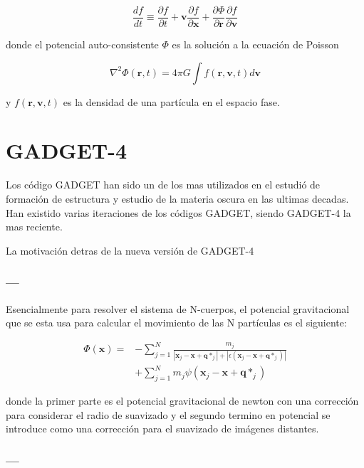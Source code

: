 \begin{equation}
\frac{d f}{d t} \equiv \frac{\partial f}{\partial t} + \mathbf{v}\frac{\partial f}{\partial \mathbf{x}} + \frac{\partial \Phi}{\partial \mathbf{r}} \frac{\partial f}{\partial \mathbf{v}}
\label{CBE}
\end{equation}

donde el potencial auto-consistente $\Phi$ es la solución a la ecuación de Poisson

\begin{equation}
\nabla^2\Phi(\mathbf{r},t) = 4\pi G \int f(\mathbf{r},\mathbf{v},t)d\mathbf{v}
\label{PoissonSol}
\end{equation}

y $f(\mathbf{r},\mathbf{v},t)$ es la densidad de una partícula en el espacio fase.




\section{GADGET-4}
Los código GADGET han sido un de los mas utilizados en el estudió de formación de estructura y estudio de la materia oscura en las ultimas decadas. Han existido varias iteraciones de los códigos GADGET, siendo GADGET-4 la mas reciente.

La motivación detras de la nueva versión de GADGET-4
\cite{2021MNRAS.506.2871S}






\subsubsection{---}
Esencialmente para resolver el sistema de N-cuerpos, el potencial gravitacional que se esta usa para calcular el movimiento de las N partículas es el siguiente:

\begin{align}
    \Phi (\textbf{x}) = &- \sum_{j=1}^{N} \frac{m_j}{|\textbf{x}_j-\textbf{x}+\textbf{q}*_j| + |\epsilon(\textbf{x}_j-\textbf{x}+\textbf{q}*_j)|} \nonumber \\
    &+ \sum_{j=1}^{N} m_j \psi (\textbf{x}_j-\textbf{x}+\textbf{q}*_j)
\end{align}

donde la primer parte es el potencial gravitacional de newton con una corrección para considerar el radio de suavizado y el segundo termino en potencial se introduce como una corrección para el suavizado de imágenes distantes.


\subsubsection{---}

